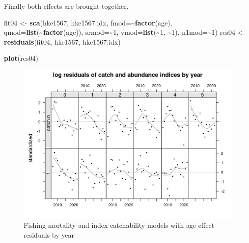 \documentclass[
]{book}
\newenvironment{Shaded}{\begin{snugshade}}{\end{snugshade}}
\newcommand{\AttributeTok}[1]{\textcolor[rgb]{0.13,0.29,0.53}{#1}}
\newcommand{\DecValTok}[1]{\textcolor[rgb]{0.00,0.00,0.81}{#1}}
\newcommand{\FunctionTok}[1]{\textcolor[rgb]{0.13,0.29,0.53}{\textbf{#1}}}
\newcommand{\NormalTok}[1]{#1}
\newcommand{\OtherTok}[1]{\textcolor[rgb]{0.56,0.35,0.01}{#1}}
\newcommand{\SpecialCharTok}[1]{\textcolor[rgb]{0.81,0.36,0.00}{\textbf{#1}}}
\begin{document}
Finally both effects are brought together.

\begin{Shaded}
\begin{Highlighting}[]
\NormalTok{fit04 }\OtherTok{\textless{}{-}} \FunctionTok{sca}\NormalTok{(hke1567, hke1567.idx,}
    \AttributeTok{fmod=}\SpecialCharTok{\textasciitilde{}}\FunctionTok{factor}\NormalTok{(age),}
    \AttributeTok{qmod=}\FunctionTok{list}\NormalTok{(}\SpecialCharTok{\textasciitilde{}}\FunctionTok{factor}\NormalTok{(age)),}
    \AttributeTok{srmod=}\SpecialCharTok{\textasciitilde{}}\DecValTok{1}\NormalTok{,}
    \AttributeTok{vmod=}\FunctionTok{list}\NormalTok{(}\SpecialCharTok{\textasciitilde{}}\DecValTok{1}\NormalTok{, }\SpecialCharTok{\textasciitilde{}}\DecValTok{1}\NormalTok{),}
    \AttributeTok{n1mod=}\SpecialCharTok{\textasciitilde{}}\DecValTok{1}\NormalTok{)}
\NormalTok{res04 }\OtherTok{\textless{}{-}} \FunctionTok{residuals}\NormalTok{(fit04, hke1567, hke1567.idx)}
\end{Highlighting}
\end{Shaded}

\begin{Shaded}
\begin{Highlighting}[]
\FunctionTok{plot}\NormalTok{(res04)}
\end{Highlighting}
\end{Shaded}

\begin{figure}
\centering
\includegraphics{_bookdown_files/_main_files/figure-html/fqageresbyyear-1.png}
\caption{\label{fig:fqageresbyyear}Fishing mortality and index catchability models with age effect residuals by year}
\end{figure}
\end{document}
